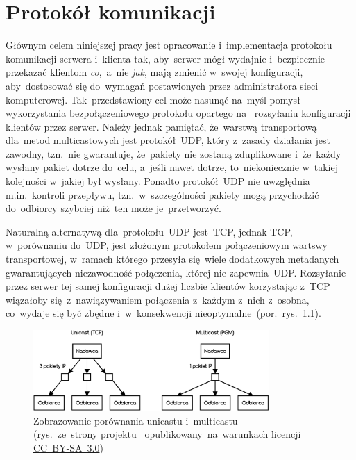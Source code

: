 \documentclass[thesis]{subfiles}
\begin{document}
\chapter{Protokół komunikacji}

Głównym celem niniejszej pracy jest opracowanie i~implementacja protokołu komunikacji serwera i~klienta tak, aby~serwer mógł wydajnie i~bezpiecznie przekazać klientom \emph{co},~a~nie \emph{jak}, mają zmienić w~swojej konfiguracji, aby~dostosować się do~wymagań postawionych przez administratora sieci komputerowej. Tak~przedstawiony cel może nasunąć na~myśl pomysł wykorzystania bezpołączeniowego protokołu opartego na~ rozsyłaniu konfiguracji klientów przez serwer. Należy jednak pamiętać, że~warstwą transportową dla~metod multicastowych jest protokół~\href{https://en.wikipedia.org/wiki/User_Datagram_Protocol}{UDP}, który z~zasady działania jest zawodny, tzn.~nie gwarantuje, że~pakiety nie zostaną zduplikowane i~że~każdy wysłany pakiet dotrze do~celu, a~jeśli nawet dotrze, to~niekoniecznie w~takiej kolejności w~jakiej był wysłany. Ponadto protokół~UDP nie uwzględnia m.in.~kontroli przepływu, tzn.~w~szczególności pakiety mogą przychodzić do~odbiorcy szybciej niż~ten może je~przetworzyć.

Naturalną alternatywą dla~protokołu~UDP jest~TCP, jednak TCP, w~porównaniu do~UDP, jest złożonym protokołem połączeniowym wartswy transportowej, w~ramach którego przesyła się~wiele dodatkowych metadanych gwarantujących niezawodność połączenia, której nie zapewnia~UDP. Rozsyłanie przez serwer tej samej konfiguracji dużej liczbie klientów korzystając z~TCP wiązałoby się~z~nawiązywaniem połączenia z~każdym z~nich z~osobna, co~wydaje się być zbędne i~w~konsekwencji nieoptymalne~(por.~rys.~\ref{fig:unicast-vs-multicast}).

\begin{figure}
	\centering
	\includegraphics[width=0.8\textwidth]{img/unicast-vs-multicast}
	\caption{Zobrazowanie porównania unicastu i~multicastu\\(rys.~ze~strony projektu~ opublikowany~na~warunkach licencji  \href{https://creativecommons.org/licenses/by-sa/3.0/}{CC~BY-SA~3.0})}
	\label{fig:unicast-vs-multicast}
\end{figure}
\end{document}
